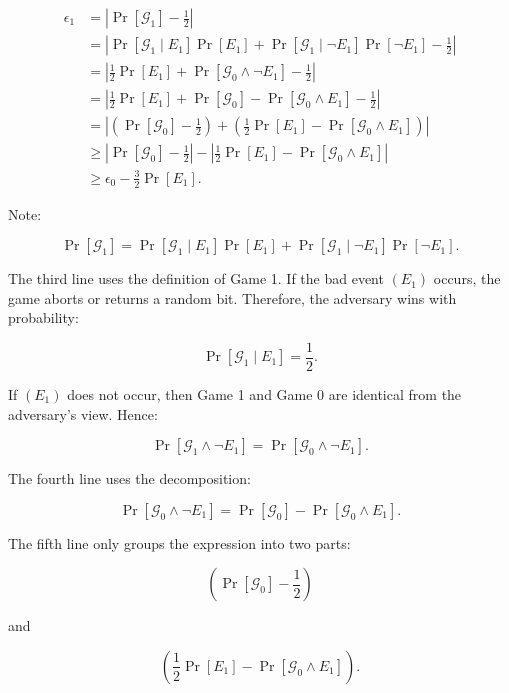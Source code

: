 \documentclass[
]{article}
\begin{document}
\[
\begin{equation}
\begin{aligned}
\epsilon_1
&= \left|\Pr[\mathcal{G}_1]-\frac{1}{2}\right| \\[2mm]
&= \left|
    \Pr[\mathcal{G}_1\mid E_1]\Pr[E_1]
    +
    \Pr[\mathcal{G}_1\mid \neg E_1]\Pr[\neg E_1]
    -
    \frac{1}{2}
   \right| \\[2mm]
&= \left|
    \frac{1}{2}\Pr[E_1]
    +
    \Pr[\mathcal{G}_0\wedge \neg E_1]
    -
    \frac{1}{2}
   \right| \\[2mm]
&= \left|
    \frac{1}{2}\Pr[E_1]
    +
    \Pr[\mathcal{G}_0]
    -
    \Pr[\mathcal{G}_0\wedge E_1]
    -
    \frac{1}{2}
   \right| \\[2mm]
&= \left|
    \left(\Pr[\mathcal{G}_0]-\frac{1}{2}\right)
    +
    \left(\frac{1}{2}\Pr[E_1]
    -
    \Pr[\mathcal{G}_0\wedge E_1]\right)
   \right| \\[2mm]
&\ge
   \left|\Pr[\mathcal{G}_0]-\frac{1}{2}\right|
   -
   \left|
    \frac{1}{2}\Pr[E_1]
    -
    \Pr[\mathcal{G}_0\wedge E_1]
   \right| \\[2mm]
&\ge
   \epsilon_0
   -
   \frac{3}{2}\Pr[E_1].
\end{aligned}
\end{equation}
\]

Note:

\[
\Pr[\mathcal{G}_1]
=
\Pr[\mathcal{G}_1\mid E_1]\Pr[E_1]
+
\Pr[\mathcal{G}_1\mid \neg E_1]\Pr[\neg E_1].
\]

The third line uses the definition of Game 1. If the bad event \((E_1)\)
occurs, the game aborts or returns a random bit. Therefore, the
adversary wins with probability:

\[
\Pr[\mathcal{G}_1\mid E_1]=\frac{1}{2}.
\]

If \((E_1)\) does not occur, then Game 1 and Game 0 are identical from
the adversary's view. Hence:

\[
\Pr[\mathcal{G}_1\wedge \neg E_1]
=
\Pr[\mathcal{G}_0\wedge \neg E_1].
\]

The fourth line uses the decomposition:

\[
\Pr[\mathcal{G}_0\wedge \neg E_1]
=
\Pr[\mathcal{G}_0]
-
\Pr[\mathcal{G}_0\wedge E_1].
\]

The fifth line only groups the expression into two parts:

\[
\left(\Pr[\mathcal{G}_0]-\frac{1}{2}\right)
\]

and

\[
\left(\frac{1}{2}\Pr[E_1]-\Pr[\mathcal{G}_0\wedge E_1]\right).
\]
\end{document}
